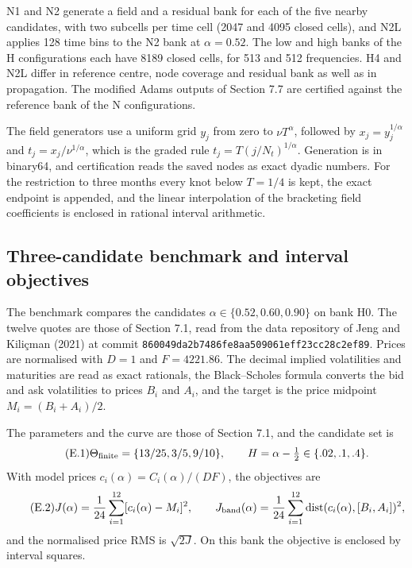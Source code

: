 \documentclass[11pt,a4paper]{article}
\newcommand{\code}[1]{\texttt{\small #1}}
\begin{document}
N1 and N2 generate a field and a residual bank for each of the five nearby candidates, with two subcells per time cell (2047 and 4095 closed cells), and N2L applies 128 time bins to the N2 bank at \(\alpha=0.52\). The low and high banks of the H configurations each have 8189 closed cells, for 513 and 512 frequencies. H4 and N2L differ in reference centre, node coverage and residual bank as well as in propagation. The modified Adams outputs of Section 7.7 are certified against the reference bank of the N configurations.

The field generators use a uniform grid \(y_j\) from zero to \(\nu T^\alpha\), followed by \(x_j=y_j^{1/\alpha}\) and \(t_j=x_j/\nu^{1/\alpha}\), which is the graded rule \(t_j=T(j/N_t)^{1/\alpha}\). Generation is in binary64, and certification reads the saved nodes as exact dyadic numbers. For the restriction to three months every knot below \(T=1/4\) is kept, the exact endpoint is appended, and the linear interpolation of the bracketing field coefficients is enclosed in rational interval arithmetic.

\setcounter{subsection}{1}\subsection{Three-candidate benchmark and interval objectives}

The benchmark compares the candidates \(\alpha\in\{0.52,0.60,0.90\}\) on bank H0. The twelve quotes are those of Section 7.1, read from the data repository of Jeng and Kiliçman (2021) at commit \code{860049da2b7486fe8aa509061eff23cc28c2ef89}. Prices are normalised with \(D=1\) and \(F=4221.86\). The decimal implied volatilities and maturities are read as exact rationals, the Black–Scholes formula converts the bid and ask volatilities to prices \(B_i\) and \(A_i\), and the target is the price midpoint \(M_i=(B_i+A_i)/2\).

The parameters and the curve are those of Section 7.1, and the candidate set is
\begin{equation*}\tag{E.1}
\Theta_{\rm finite}=\{13/25,3/5,9/10\},\qquad
H=\alpha-\tfrac12\in\{.02,.1,.4\}.
\end{equation*}
With model prices \(c_i(\alpha)=C_i(\alpha)/(DF)\), the objectives are
\begin{equation*}\tag{E.2}
J(\alpha)=\frac1{24}\sum_{i=1}^{12}
 [c_i(\alpha)-M_i]^2,\qquad
J_{\rm band}(\alpha)=\frac1{24}\sum_{i=1}^{12}
 \operatorname{dist}(c_i(\alpha),[B_i,A_i])^2,
\end{equation*}
and the normalised price RMS is \(\sqrt{2J}\). On this bank the objective is enclosed by interval squares.
\end{document}
